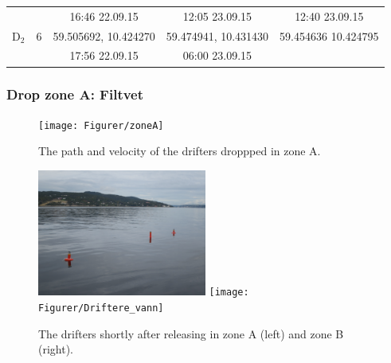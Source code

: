 \documentclass[12pt,a4paper,english]{article}
\begin{document}
\begin{table}[tb]
\begin{tabular}{|c|c|ccc|}
             &         & 16:46 22.09.15       & 12:05 23.09.15          & 12:40 23.09.15             \\
        D$_2$& 6       & 59.505692, 10.424270 & 59.474941, 10.431430    & 59.454636 10.424795        \\
             &         & 17:56 22.09.15       & 06:00 23.09.15          &                            \\ 
\hline 
\end{tabular}
\end{table}
\clearpage


\subsubsection{Drop zone A: Filtvet}
%
\begin{figure}[ht]
\centerline{
\texttt{[image: Figurer/zoneA]}}
\caption{\small
The path and velocity of the drifters droppped in zone A.%
}
\label{fig:ZoneA}
\end{figure}
%
%
\begin{figure}[ht]
\centerline{
\includegraphics*[width=0.495\textwidth]{Figurer/Driftere_vann2}
\texttt{[image: Figurer/Driftere\_vann]}
}
\caption{\small
The drifters shortly after releasing in zone A (left) and zone B (right).
}
\label{fig:DriftereVann}
\end{figure}
\end{document}

